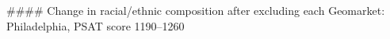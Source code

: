 #### Change in racial/ethnic composition after excluding each Geomarket: Philadelphia, PSAT score 1190–1260
